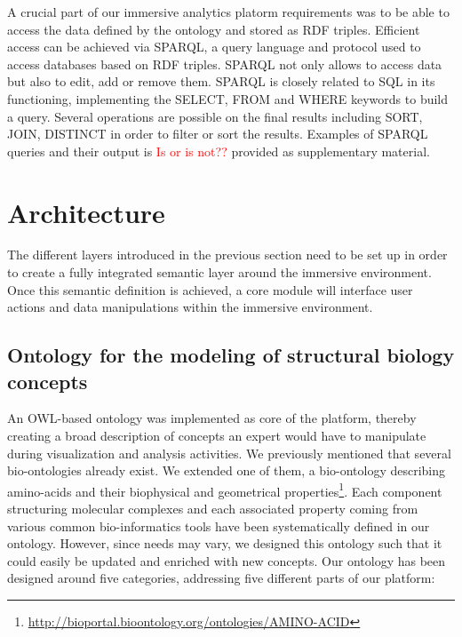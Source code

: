 \documentclass{vgtc}                          %
\newcommand*\mvb[1]{\textcolor{red}{#1}}
\begin{document}
A crucial part of our immersive analytics platorm requirements was to be able to access the data defined by the ontology and stored as RDF triples. Efficient access can be achieved via SPARQL, a query language and protocol used to access databases based on RDF triples. SPARQL not only allows to access data but also to edit, add or remove them. 
SPARQL is closely related to SQL in its functioning, implementing the SELECT, FROM and WHERE keywords to build a query. 
Several operations are possible on the final results including SORT, JOIN, DISTINCT in order to filter or sort the results. Examples of SPARQL queries and their output is \mvb{Is or is not??} provided as supplementary material.

\section{Architecture}

The different layers introduced in the previous section need to be set up in order to create a fully integrated semantic layer around the immersive environment. Once this semantic definition is achieved, a core module will interface user actions and data manipulations within the immersive environment.

\subsection{Ontology for the modeling of structural biology concepts}

An OWL-based ontology was implemented as core of the platform, thereby creating a broad description of concepts an expert would have to manipulate during visualization and analysis activities. We previously mentioned that several bio-ontologies already exist. We extended one of them, a bio-ontology describing amino-acids and their biophysical and geometrical properties\footnote{\url{http://bioportal.bioontology.org/ontologies/AMINO-ACID}}.
Each component structuring molecular complexes and each associated property coming from various common bio-informatics tools have been systematically defined in our ontology. However, since needs may vary, we designed this ontology such that it could easily be updated and enriched with new concepts.
Our ontology has been designed around five categories, addressing five different parts of our platform:
\end{document}
